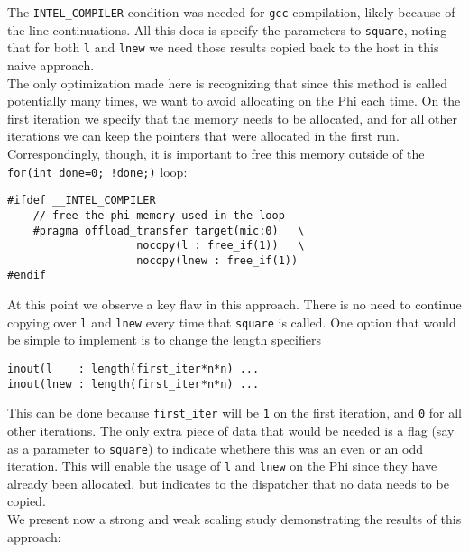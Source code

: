 \documentclass[11pt]{article}
\begin{document}
\noindent The \texttt{INTEL\_COMPILER} condition was needed for \texttt{gcc} compilation, likely because of the line continuations.  All this does is specify the parameters to \texttt{square}, noting that for both \texttt{l} and \texttt{lnew} we need those results copied back to the host in this naive approach.\\

\noindent The only optimization made here is recognizing that since this method is called potentially many times, we want to avoid allocating on the Phi each time.  On the first iteration we specify that the memory needs to be allocated, and for all other iterations we can keep the pointers that were allocated in the first run.  Correspondingly, though, it is important to free this memory outside of the \texttt{for(int done=0; !done;)} loop:

\begin{lstlisting}
#ifdef __INTEL_COMPILER
    // free the phi memory used in the loop
    #pragma offload_transfer target(mic:0)   \
                    nocopy(l : free_if(1))   \
                    nocopy(lnew : free_if(1))
#endif
\end{lstlisting}

\noindent At this point we observe a key flaw in this approach.  There is no need to continue copying over \texttt{l} and \texttt{lnew} every time that \texttt{square} is called.  One option that would be simple to implement is to change the length specifiers

\begin{lstlisting}
inout(l    : length(first_iter*n*n) ...
inout(lnew : length(first_iter*n*n) ...
\end{lstlisting}

\noindent This can be done because \texttt{first\_iter} will be \texttt{1} on the first iteration, and \texttt{0} for all other iterations.  The only extra piece of data that would be needed is a flag (say as a parameter to \texttt{square}) to indicate whethere this was an even or an odd iteration.  This will enable the usage of \texttt{l} and \texttt{lnew} on the Phi since they have already been allocated, but indicates to the dispatcher that no data needs to be copied.\\

\noindent We present now a strong and weak scaling study demonstrating the results of this approach:
\end{document}
